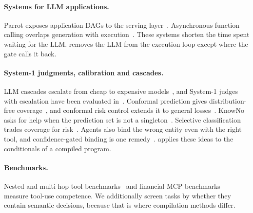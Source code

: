 \paragraph{Systems for LLM applications.} Parrot exposes application DAGs to the serving layer~\cite{lin2024parrot}. Asynchronous function calling overlaps generation with execution~\cite{gim2024asynclm}. These systems shorten the time spent waiting for the LLM. \jif removes the LLM from the execution loop except where the gate calls it back.

\paragraph{System-1 judgments, calibration and cascades.} LLM cascades escalate from cheap to expensive models~\cite{chen2023frugalgpt}, and System-1 judges with escalation have been evaluated in~\cite{li2026jevjudge}. Conformal prediction gives distribution-free coverage~\cite{vovk2005algorithmic,angelopoulos2021gentle}, and conformal risk control extends it to general losses~\cite{angelopoulos2024crc}. KnowNo asks for help when the prediction set is not a singleton~\cite{ren2023knowno}. Selective classification trades coverage for risk~\cite{geifman2017selective}. Agents also bind the wrong entity even with the right tool, and confidence-gated binding is one remedy~\cite{suresh2026entity}. \jif applies these ideas to the conditionals of a compiled program.

\paragraph{Benchmarks.} Nested and multi-hop tool benchmarks~\cite{basu2024nestful,ye2025toolhop,patil2025bfcl,zhong2025complexfuncbench,maekawa2026funcbenchgen,song2023restgpt} and financial MCP benchmarks~\cite{zhu2026finmcp} measure tool-use competence. We additionally screen tasks by whether they contain semantic decisions, because that is where compilation methods differ.
